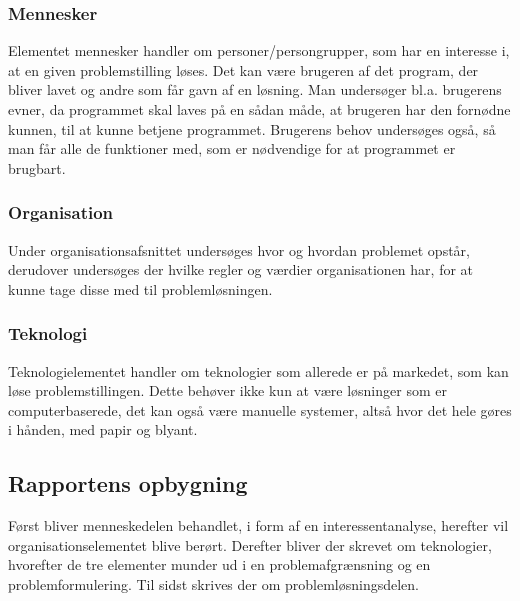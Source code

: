 \subsubsection{Mennesker}\label{subsubsec:mennesker}

Elementet mennesker handler om personer/persongrupper, som har en interesse i, at en given problemstilling
løses. Det kan være brugeren af det program, der bliver lavet og andre som får gavn af en løsning. Man
undersøger bl.a. brugerens evner, da programmet skal laves på en sådan måde, at brugeren har den
fornødne kunnen, til at kunne betjene programmet. Brugerens behov undersøges også, så man får alle de funktioner
med, som er nødvendige for at programmet er brugbart.


\subsubsection{Organisation}\label{subsubsec:organisation}

Under organisationsafsnittet undersøges hvor og hvordan problemet opstår, derudover undersøges der hvilke regler
og værdier organisationen har, for at kunne tage disse med til problemløsningen.


\subsubsection{Teknologi}\label{subsubsec:Teknologi}

Teknologielementet handler om teknologier som allerede er på markedet, som kan løse problemstillingen. Dette
behøver ikke kun at være løsninger som er computerbaserede, det kan også være manuelle systemer, altså hvor
det hele gøres i hånden, med papir og blyant.


\subsection{Rapportens opbygning}\label{subsec:rapportens-opbygning}

Først bliver menneskedelen behandlet, i form af en interessentanalyse, herefter vil organisationselementet blive berørt. Derefter bliver der skrevet om teknologier,
hvorefter de tre elementer munder ud i en problemafgrænsning og en problemformulering. Til sidst skrives der
om problemløsningsdelen. 
